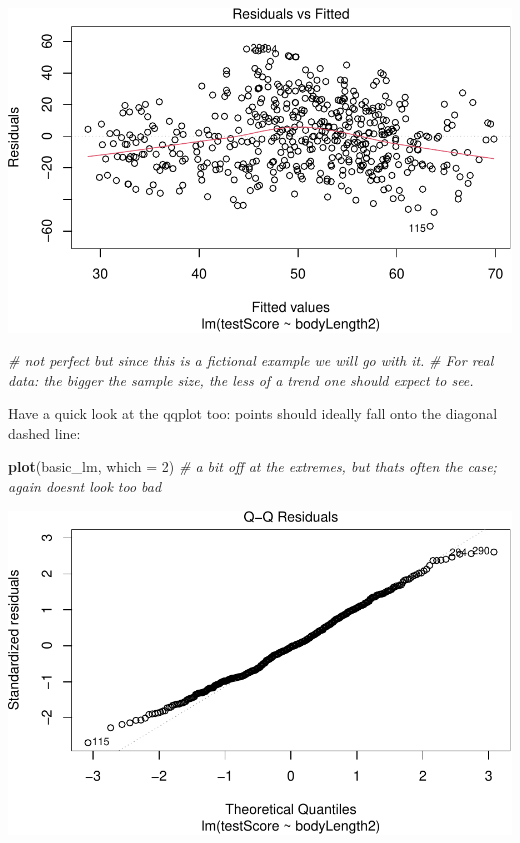 \documentclass[
]{article}
\newenvironment{Shaded}{\begin{snugshade}}{\end{snugshade}}
\newcommand{\AttributeTok}[1]{\textcolor[rgb]{0.13,0.29,0.53}{#1}}
\newcommand{\CommentTok}[1]{\textcolor[rgb]{0.56,0.35,0.01}{\textit{#1}}}
\newcommand{\DecValTok}[1]{\textcolor[rgb]{0.00,0.00,0.81}{#1}}
\newcommand{\FunctionTok}[1]{\textcolor[rgb]{0.13,0.29,0.53}{\textbf{#1}}}
\newcommand{\NormalTok}[1]{#1}
\begin{document}
\begin{center}\includegraphics{Introduction-to-linear-mixed-models_files/figure-latex/unnamed-chunk-6-1} \end{center}

\begin{Shaded}
\begin{Highlighting}[]
\CommentTok{\# not perfect but since this is a fictional example we will go with it.}
\CommentTok{\# For real data: the bigger the sample size, the less of a trend one should expect to see.}
\end{Highlighting}
\end{Shaded}

Have a quick look at the qqplot too: points should ideally fall onto the
diagonal dashed line:

\begin{Shaded}
\begin{Highlighting}[]
\FunctionTok{plot}\NormalTok{(basic\_lm, }\AttributeTok{which =} \DecValTok{2}\NormalTok{)   }\CommentTok{\# a bit off at the extremes, but that\textquotesingle{}s often the case; again doesn\textquotesingle{}t look too bad}
\end{Highlighting}
\end{Shaded}

\includegraphics{Introduction-to-linear-mixed-models_files/figure-latex/unnamed-chunk-7-1.pdf}
\end{document}
